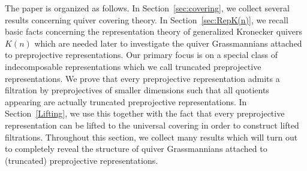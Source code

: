 \documentclass[smallextended,envcountsect,envcountsame]{svjour3}
\numberwithin{equation}{section}
\begin{document}
The paper is organized as follows.
In Section~\ref{sec:covering}, we collect several results concerning quiver covering theory.
In Section~\ref{sec:RepK(n)}, we recall basic facts concerning the representation theory of generalized Kronecker quivers $K(n)$ which are needed later to investigate the quiver Grassmannians attached to preprojective representations.
Our primary focus is on a special class of indecomposable representations which we call truncated preprojective representations.
We prove that every preprojective representation admits a filtration by preprojectives of smaller dimensions such that all quotients appearing are actually truncated preprojective representations.
In Section~\ref{Lifting}, we use this together with the fact that every preprojective representation can be lifted to the universal covering in order to construct lifted filtrations.
Throughout this section, we collect many results which will turn out to completely reveal the structure of quiver Grassmannians attached to (truncated) preprojective representations.
\end{document}
